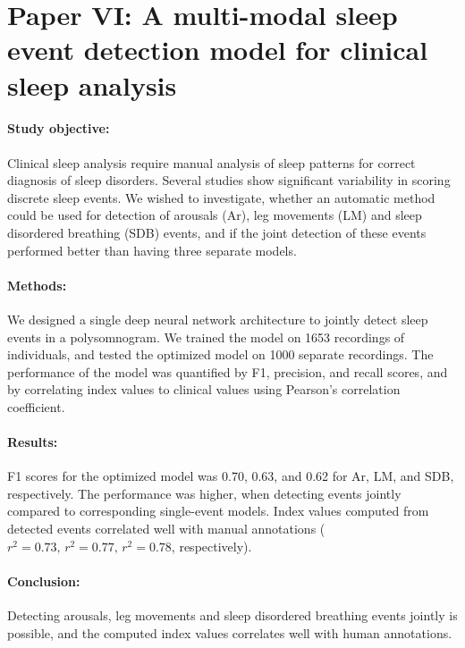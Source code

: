 \section[Paper VI: A multi-modal sleep event detection model for clinical sleep analysis]{Paper VI: A multi-modal sleep event detection model for clinical sleep analysis%
    }\label{sec:papervi}

\begin{tcolorbox}[colframe=white]
\paragraph{Study objective: } Clinical sleep analysis require manual analysis of sleep patterns for correct diagnosis of sleep disorders.
Several studies show significant variability in scoring discrete sleep events.
We wished to investigate, whether an automatic method could be used for detection of arousals (Ar), leg movements (LM) and sleep disordered breathing (SDB) events, and if the joint detection of these events performed better than having three separate models.
\paragraph{Methods: } We designed a single deep neural network architecture to jointly detect sleep events in a polysomnogram.
We trained the model on 1653 recordings of individuals, and tested the optimized model on 1000 separate recordings. 
The performance of the model was quantified by F1, precision, and recall scores, and by correlating index values to clinical values using Pearson's correlation coefficient.
\paragraph{Results: } F1 scores for the optimized model was 0.70, 0.63, and 0.62 for Ar, LM, and SDB, respectively. 
The performance was higher, when detecting events jointly compared to corresponding single-event models.
Index values computed from detected events correlated well with manual annotations (\(r^2 = 0.73, \, r^2 = 0.77, \, r^2 = 0.78\), respectively).
\paragraph{Conclusion: } Detecting arousals, leg movements and sleep disordered breathing events jointly is possible, and the computed index values correlates well with human annotations.
\end{tcolorbox}

